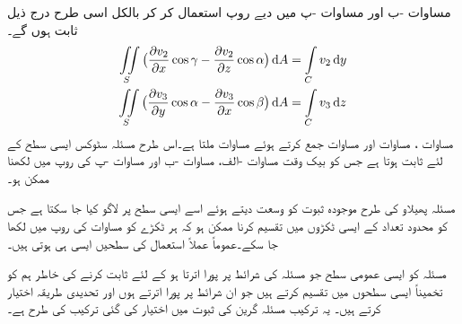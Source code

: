  مساوات -ب اور مساوات -پ میں دیے روپ استعمال کر کر بالکل اسی طرح درج ذیل ثابت ہوں گے۔
\begin{align}
\iint\limits_S \big(\frac{\partial v_2}{\partial x}\cos \gamma-\frac{\partial v_2}{\partial z}\cos \alpha\big)\dif A
&=\int\limits_C v_2\dif y \label{مساوات_خطی_تکمل_سٹوکس_ج}\\
\iint\limits_S \big(\frac{\partial v_3}{\partial y}\cos \alpha-\frac{\partial v_3}{\partial x}\cos \beta\big)\dif A
&=\int\limits_C v_3\dif z\label{مساوات_خطی_تکمل_سٹوکس_چ}
\end{align}
مساوات ، مساوات  اور مساوات  جمع کرتے ہوئے مساوات  ملتا ہے۔اس طرح مسئلہ سٹوکس ایسی سطح   کے لئے ثابت ہوتا ہے جس کو بیک وقت   مساوات -الف،  مساوات -ب اور  مساوات -پ کی روپ  میں لکھنا ممکن ہو۔

مسئلہ پھیلاو کی طرح موجودہ ثبوت کو وسعت دیتے ہوئے اسے ایسی سطح پر لاگو کیا جا سکتا ہے جس کو محدود تعداد کے ایسی ٹکڑوں میں تقسیم کرنا ممکن ہو کہ ہر ٹکڑے کو مساوات  کی روپ میں لکھا جا سکے۔عموماً عملاً استعمال کی سطحیں ایسی ہی ہوتی ہیں۔

مسئلہ کو ایسی عمومی سطح  جو مسئلہ کی شرائط پر پورا اترتا ہو کے  لئے ثابت کرنے کی خاطر ہم   کو تخمیناً ایسی سطحوں میں تقسیم کرتے ہیں جو ان شرائط پر پورا اترتے ہوں اور تحدیدی طریقہ اختیار کرتے ہیں۔ یہ ترکیب مسئلہ گرین کی ثبوت میں اختیار کی گئی ترکیب کی طرح ہے۔

